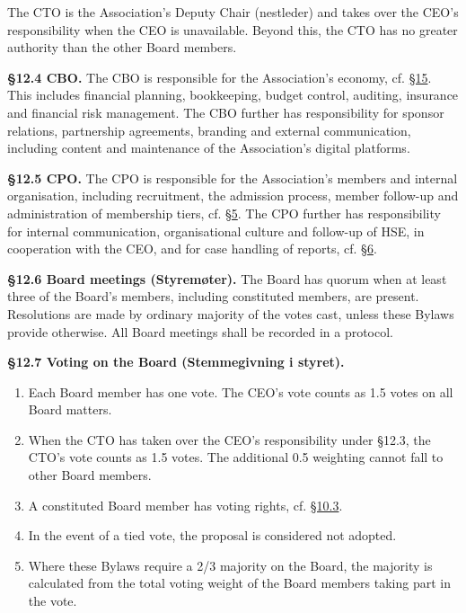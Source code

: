 \documentclass{../../../Common/Latex/Templates/rapport}
\begin{document}
The CTO is the Association's Deputy Chair (nestleder) and takes over the CEO's responsibility when the CEO is unavailable. Beyond this, the CTO has no greater authority than the other Board members.

\textbf{\S 12.4 CBO.}\label{bylaw:12.4} The CBO is responsible for the Association's economy, cf. \hyperref[bylaw:15]{\S 15}. This includes financial planning, bookkeeping, budget control, auditing, insurance and financial risk management. The CBO further has responsibility for sponsor relations, partnership agreements, branding and external communication, including content and maintenance of the Association's digital platforms.

\textbf{\S 12.5 CPO.}\label{bylaw:12.5} The CPO is responsible for the Association's members and internal organisation, including recruitment, the admission process, member follow-up and administration of membership tiers, cf. \hyperref[bylaw:5]{\S 5}. The CPO further has responsibility for internal communication, organisational culture and follow-up of HSE, in cooperation with the CEO, and for case handling of reports, cf. \hyperref[bylaw:6]{\S 6}.

\textbf{\S 12.6 Board meetings (Styremøter).}\label{bylaw:12.6} The Board has quorum when at least three of the Board's members, including constituted members, are present. Resolutions are made by ordinary majority of the votes cast, unless these Bylaws provide otherwise. All Board meetings shall be recorded in a protocol.

\textbf{\S 12.7 Voting on the Board (Stemmegivning i styret).}\label{bylaw:12.7}
\begin{enumerate}
  \item Each Board member has one vote. The CEO's vote counts as 1.5 votes on all Board matters.
  \item When the CTO has taken over the CEO's responsibility under \S12.3, the CTO's vote counts as 1.5 votes. The additional 0.5 weighting cannot fall to other Board members.
  \item A constituted Board member has voting rights, cf. \hyperref[bylaw:10.3]{\S 10.3}.
  \item In the event of a tied vote, the proposal is considered not adopted.
  \item Where these Bylaws require a 2/3 majority on the Board, the majority is calculated from the total voting weight of the Board members taking part in the vote.
\end{enumerate}
\end{document}
